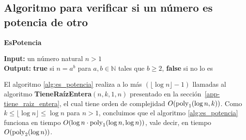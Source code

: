 \subsection{Algoritmo para verificar si un número es potencia de otro}
\label{app-es_potencia}
\begin{algorithm}[H]
\caption{\quad\textbf{EsPotencia}}
\label{alg:es_potencia}
\hspace*{\algorithmicindent} \textbf{Input:} un número natural $n>1$\\
\hspace*{\algorithmicindent} \textbf{Output:} \textbf{true} si $n = a^b$ para $a,b \in \mathbb{N}$ tales que $b \geq 2$, \textbf{false} si no lo es
\begin{algorithmic}[1]
    	\RETURN \FALSE
    \ELSE
    			\RETURN \TRUE
    		\ENDIF
		\ENDFOR    		
    	\RETURN \FALSE
    \ENDIF	 
\end{algorithmic}
\end{algorithm}
El algoritmo \ref{alg:es_potencia} realiza a lo más $(\lfloor \log n\rfloor - 1)$ llamadas al algoritmo \textbf{TieneRaízEntera}$(n,k,1,n)$ presentado en la sección~\ref{app-tiene_raiz_entera}, el cual tiene orden de complejidad $O({\rm poly}_1(\log n, k))$. Como $k \leq \lfloor \log n\rfloor \leq \log n$ para $n > 1$, 
concluimos que  
el algoritmo \ref{alg:es_potencia} funciona en tiempo $O(\log n \cdot {\rm poly}_1(\log n, \log n))$, vale decir, en tiempo~$O({\rm poly}_2(\log n))$.



